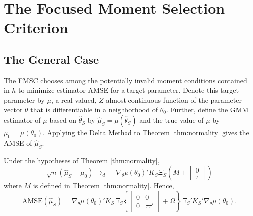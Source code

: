 \section{The Focused Moment Selection Criterion}
\label{sec:FMSC}

\subsection{The General Case}
The FMSC chooses among the potentially invalid moment conditions contained in $h$ to minimize estimator AMSE for a target parameter. 
Denote this target parameter by $\mu$, a real-valued, $Z$-almost continuous function of the parameter vector $\theta$ that is differentiable in a neighborhood of $\theta_0$. 
Further, define the GMM estimator of $\mu$ based on $\widehat{\theta}_S$ by $\widehat{\mu}_S = \mu(\widehat{\theta}_S)$ and the true value of $\mu$ by $\mu_0 = \mu(\theta_0)$. 
Applying the Delta Method to Theorem \ref{thm:normality} gives the AMSE of $\widehat{\mu}_S$.

\begin{cor}
\label{cor:target}
Under the hypotheses of Theorem \ref{thm:normality}, 
$$\sqrt{n}\left(\widehat{\mu}_S - \mu_0\right)\rightarrow_d-\nabla_\theta\mu(\theta_0)'K_S \Xi_S \left(M +  \left[\begin{array}
	{c} 0 \\ \tau
\end{array} \right]\right)$$ 
where $M$ is defined in Theorem \ref{thm:normality}.
Hence,
	$$\mbox{AMSE}\left(\widehat{\mu}_S\right) = \nabla_\theta\mu(\theta_0)'K_S \Xi_S \left\{\left[\begin{array}{cc}0&0\\0&\tau\tau'\end{array}\right] + \Omega\right\}\Xi_S'K_S'\nabla_\theta\mu(\theta_0).$$
\end{cor}

